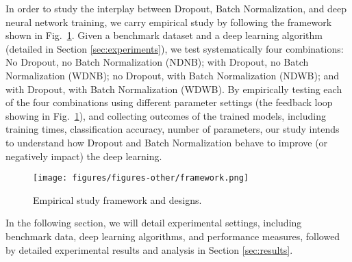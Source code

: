 \documentclass[../dropout-vs-batch-normalization.tex]{subfiles}
\begin{document}
In order to study the interplay between Dropout, Batch Normalization, and deep neural network training, we carry empirical study by following the framework shown in Fig.~\ref{fig:framework}. Given a benchmark dataset and a deep learning algorithm (detailed in Section \ref{sec:experiments}), we test systematically  four combinations: No Dropout, no Batch Normalization (NDNB); with Dropout, no Batch Normalization (WDNB); no Dropout, with Batch Normalization (NDWB); and with Dropout, with Batch Normalization (WDWB). By empirically testing each of the four combinations using different parameter settings (the feedback loop showing in Fig.~\ref{fig:framework}), and collecting outcomes of the trained models, including training times, classification accuracy, number of parameters, our study intends to understand how Dropout and Batch Normalization behave to improve (or negatively impact) the deep learning. 

\begin{figure}
\centerline{\texttt{[image: figures/figures-other/framework.png]}}
\caption{Empirical study framework and designs.}
\label{fig:framework}
\end{figure}

In the following section, we will detail experimental settings, including benchmark data, deep learning algorithms, and performance measures, followed by detailed experimental results and analysis in Section \ref{sec:results}.
\end{document}
